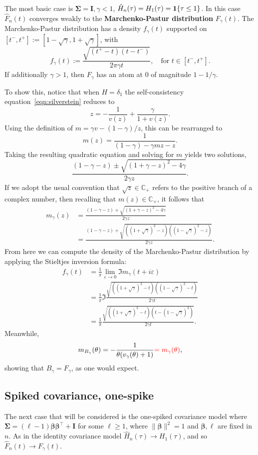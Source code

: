 \documentclass{article}
\newcommand{\bbeta}{\boldsymbol{\beta}}
\newcommand{\bSigma}{\boldsymbol{\Sigma}}
\newcommand{\bI}{\boldsymbol{I}}
\begin{document}
The most basic case is $\bSigma = \bI, \gamma < 1$, $\hat{H}_n(\tau) = H_1(\tau) = \mathbf{1}\{\tau \leq 1\}$. In this case $\hat{F}_n(t)$ converges weakly to the {\bf Marchenko-Pastur distribution} $F_{\gamma}(t)$. The Marchenko-Pastur distribution has a density $f_{\gamma}(t)$ supported on $[t^{-},t^{+}] := [1 - \sqrt{\gamma}, 1 + \sqrt{\gamma}]$, with 
$$
f_{\gamma}(t) := \frac{\sqrt{(t^{+} - t)(t - t^{-})}}{2 \pi \gamma t}, \quad \textrm{for $t \in [t^{-},t^{+}]$.}
$$
If additionally $\gamma > 1$, then $F_{\gamma}$ has an atom at $0$ of magnitude $1 - 1/\gamma$. 

To show this, notice that when $H = \delta_1$ the self-consistency equation~\eqref{eqn:silverstein} reduces to
$$
z = -\frac{1}{v(z)} + \frac{\gamma}{1 + v(z)}.
$$
Using the definition of $m = \gamma v - (1 - \gamma)/z$, this can be rearranged to 
$$
m(z)= \frac{1}{(1 - \gamma) - \gamma m z - z}.
$$
Taking the resulting quadratic equation and solving for $m$ yields two solutions, 
$$
\frac{(1 - \gamma - z) \pm \sqrt{(1 + \gamma - z)^2 - 4 \gamma}}{2 \gamma z}.
$$
If we adopt the usual convention that $\sqrt{z} \in \mathbb{C}_{+}$ refers to the positive branch of a complex number, then recalling that $m(z) \in \mathbb{C}_{+}$, it follows that 
\begin{align*}
m_{\gamma}(z) 
& = \frac{(1 - \gamma - z) + \sqrt{(1 + \gamma - z)^2 - 4 \gamma}}{2 \gamma z} \\
& = \frac{(1 - \gamma - z) + \sqrt{( (1 + \sqrt{\gamma})^2 - z)((1 - \sqrt{\gamma})^2 - z)}}{2 \gamma z}.
\end{align*}
From here we can compute the density of the Marchenko-Pastur distribution by applying the Stieltjes inversion formula:
\begin{align*}
f_{\gamma}(t) 
& = \frac{1}{\pi}\lim_{\varepsilon \to 0} \Im m_{\gamma}(t + i \varepsilon) \\
& = \frac{1}{\pi} \Im \frac{\sqrt{( (1 + \sqrt{\gamma})^2 - t)((1 - \sqrt{\gamma})^2 - t)}}{2 \gamma t} \\
& = \frac{1}{\pi} \frac{\sqrt{( (1 + \sqrt{\gamma})^2 - t)(t - (1 - \sqrt{\gamma})^2)}}{2 \gamma t}.
\end{align*}
Meanwhile,
$$
m_{B_{\gamma}}(\theta) = -\frac{1}{\theta(v_{\gamma}(\theta) + 1)} \textcolor{red}{= m_{\gamma}(\theta)}, 
$$
showing that $B_{\gamma} = F_{\gamma}$, as one would expect.

\subsection{Spiked covariance, one-spike}
The next case that will be considered is the one-spiked covariance model where $\bSigma = (\ell - 1) \bbeta \bbeta^{\top} + \bI$ for some $\ell \geq 1$, where $\|\bbeta\|^2 = 1$ and $\bbeta, \ell$ are fixed in $n$. As in the identity covariance model $\hat{H}_n(\tau) \to H_1(\tau)$, and so $\hat{F}_n(t) \to F_{\gamma}(t)$. 
\end{document}

